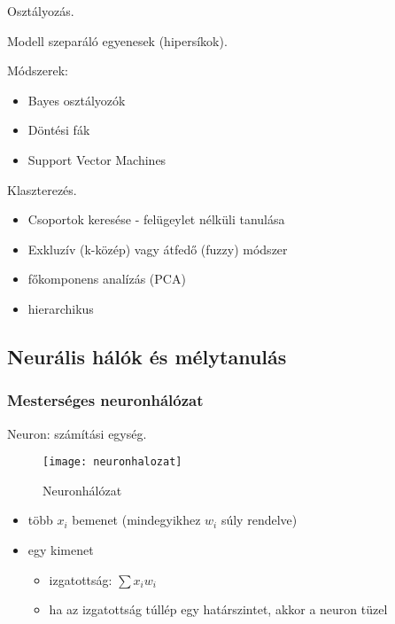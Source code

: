 \begin{definicio}
    Osztályozás.

    Modell szeparáló egyenesek (hipersíkok).

    Módszerek:
    \begin{itemize}
        \item Bayes osztályozók
        \item Döntési fák
        \item Support Vector Machines
    \end{itemize}
\end{definicio}

\begin{definicio}
    Klaszterezés.

    \begin{itemize}
        \item Csoportok keresése - felügeylet nélküli tanulása
        \item Exkluzív (k-közép) vagy átfedő (fuzzy) módszer
        \item főkomponens analízás (PCA)
        \item hierarchikus
    \end{itemize}
\end{definicio}

\subsection{Neurális hálók és mélytanulás}

\subsubsection{Mesterséges neuronhálózat}

\begin{definicio}
    Neuron: számítási egység.
\end{definicio}

\begin{figure}[H]
    \centering
    \texttt{[image: neuronhalozat]}
    \caption{Neuronhálózat}
    \label{fig:neuronhalozat}
\end{figure}

\begin{itemize}
    \item több $x_i$ bemenet (mindegyikhez $w_i$ súly rendelve)
    \item egy kimenet
        \begin{itemize}
            \item izgatottság: $\sum x_i w_i$
            \item ha az izgatottság túllép egy határszintet, akkor a neuron
                tüzel
        \end{itemize}
\end{itemize}

